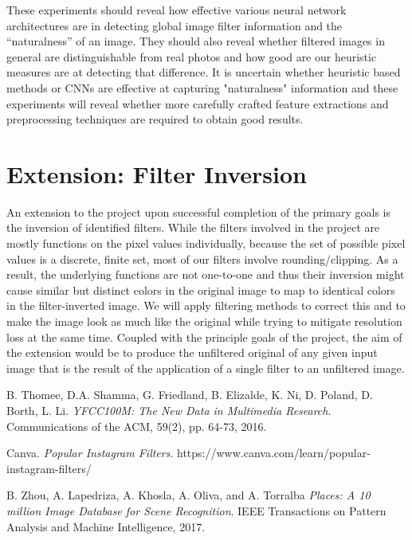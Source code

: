 \documentclass[a4paper, 11pt]{article}
\begin{document}
These experiments should reveal how effective various neural network architectures are in detecting global image filter information and the ``naturalness'' of an image. They should also reveal whether filtered images in general are distinguishable from real photos and how good are our heuristic measures are at detecting that difference. It is uncertain whether heuristic based methods or CNNs are effective at capturing "naturalness" information and these experiments will reveal whether more carefully crafted feature extractions and preprocessing techniques are required to obtain good results. 

\section*{Extension: Filter Inversion}
An extension to the project upon successful completion of the primary goals is the inversion of identified filters. While the filters involved in the project are mostly functions on the pixel values individually, because the set of possible pixel values is a discrete, finite set, most of our filters involve rounding/clipping. As a result, the underlying functions are not one-to-one and thus their inversion might cause similar but distinct colors in the original image to map to identical colors in the filter-inverted image. We will apply filtering methods to correct this and to make the image look as much like the original while trying to mitigate resolution loss at the same time. Coupled with the principle goals of the project, the aim of the extension would be to produce the unfiltered original of any given input image that is the result of the application of a single filter to an unfiltered image.

\begin{thebibliography}{9}
 B. Thomee, D.A. Shamma, G. Friedland, B. Elizalde, K. Ni, D. Poland, D. Borth, L. Li. \emph{YFCC100M: The New Data in Multimedia Research}. Communications of the ACM, 59(2), pp. 64-73, 2016.

 Canva. \emph{Popular Instagram Filters}. https://www.canva.com/learn/popular-instagram-filters/

 B. Zhou, A. Lapedriza, A. Khosla, A. Oliva, and A. Torralba \emph{Places: A 10 million Image Database for Scene Recognition}. IEEE Transactions on Pattern Analysis and Machine Intelligence, 2017.

\end{thebibliography}
\end{document}
